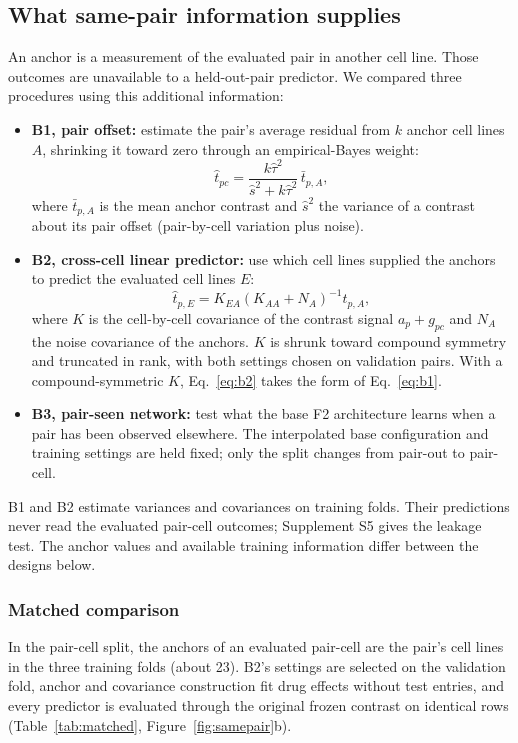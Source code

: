 \documentclass[11pt]{article}
\begin{document}
\subsection{What same-pair information supplies}\label{sec:samepair}
An anchor is a measurement of the evaluated pair in another cell line. Those outcomes are unavailable to a held-out-pair predictor. We compared three procedures using this additional information:
\begin{itemize}
\item \textbf{B1, pair offset:} estimate the pair's average residual from $k$ anchor cell lines $A$, shrinking it toward zero through an empirical-Bayes weight:
\begin{equation}\label{eq:b1}
\hat t_{pc}=\frac{k\hat\tau^2}{\hat s^2+k\hat\tau^2}\,\bar t_{p,A},
\end{equation}
where $\bar t_{p,A}$ is the mean anchor contrast and $\hat s^2$ the variance of a contrast about its pair offset (pair-by-cell variation plus noise).
\item \textbf{B2, cross-cell linear predictor:} use which cell lines supplied the anchors to predict the evaluated cell lines $E$:
\begin{equation}\label{eq:b2}
\hat t_{p,E}=K_{EA}(K_{AA}+N_A)^{-1}t_{p,A},
\end{equation}
where $K$ is the cell-by-cell covariance of the contrast signal $a_p+g_{pc}$ and $N_A$ the noise covariance of the anchors. $K$ is shrunk toward compound symmetry and truncated in rank, with both settings chosen on validation pairs. With a compound-symmetric $K$, Eq.~\eqref{eq:b2} takes the form of Eq.~\eqref{eq:b1}.
\item \textbf{B3, pair-seen network:} test what the base F2 architecture learns when a pair has been observed elsewhere. The interpolated base configuration and training settings are held fixed; only the split changes from pair-out to pair-cell.
\end{itemize}
B1 and B2 estimate variances and covariances on training folds. Their predictions never read the evaluated pair-cell outcomes; Supplement S5 gives the leakage test. The anchor values and available training information differ between the designs below.

\subsubsection*{Matched comparison} In the pair-cell split, the anchors of an evaluated pair-cell are the pair's cell lines in the three training folds (about 23). B2's settings are selected on the validation fold, anchor and covariance construction fit drug effects without test entries, and every predictor is evaluated through the original frozen contrast on identical rows (Table~\ref{tab:matched}, Figure~\ref{fig:samepair}b).
\end{document}
